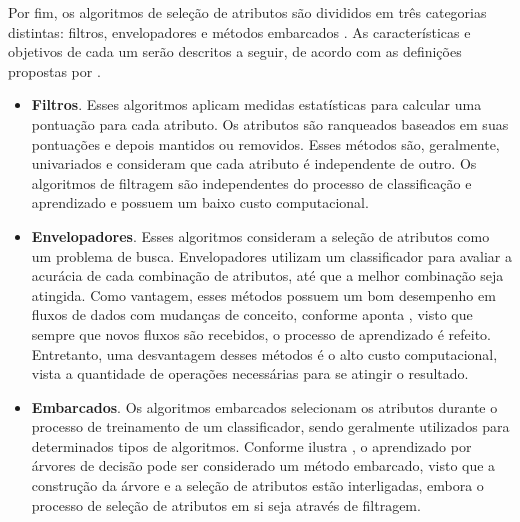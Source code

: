 

Por fim, os algoritmos de seleção de atributos são divididos em três categorias distintas: filtros, envelopadores e métodos embarcados . As características e objetivos de cada um serão descritos a seguir, de acordo com as definições propostas por .

\begin{itemize}
\item \textbf{Filtros}. Esses algoritmos aplicam medidas estatísticas para calcular uma pontuação para cada atributo. Os atributos são ranqueados baseados em suas pontuações e depois mantidos ou removidos. Esses métodos são, geralmente, univariados e consideram que cada atributo é independente de outro. Os algoritmos de filtragem são independentes do processo de classificação e aprendizado e possuem um baixo custo computacional. 
\item \textbf{Envelopadores}. Esses algoritmos consideram a seleção de atributos como um problema de busca. Envelopadores utilizam um classificador para avaliar a acurácia de cada combinação de atributos, até que a melhor combinação seja atingida. Como vantagem, esses métodos possuem um bom desempenho em fluxos de dados com mudanças de conceito, conforme aponta , visto que sempre que novos fluxos são recebidos, o processo de aprendizado é refeito. Entretanto, uma desvantagem desses métodos é o alto custo computacional, vista a quantidade de operações necessárias para se atingir o resultado.
\item \textbf{Embarcados}. Os algoritmos embarcados selecionam os atributos durante o processo de treinamento de um classificador, sendo geralmente utilizados para determinados tipos de algoritmos. Conforme ilustra , o aprendizado por árvores de decisão pode ser considerado um método embarcado, visto que a construção da árvore e a seleção de atributos estão interligadas, embora o processo de seleção de atributos em si seja através de filtragem.
\end{itemize}

